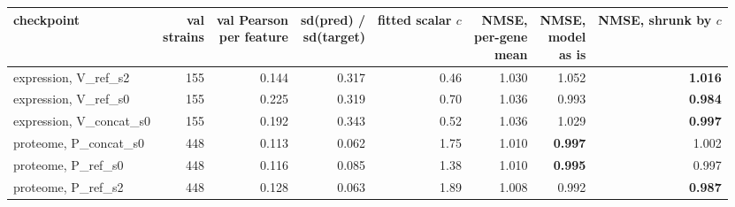 \begin{tabular}{@{}lrrrrrrr@{}}
\toprule
checkpoint & \shortstack[r]{val\\strains} & \shortstack[r]{val Pearson\\per feature} & \shortstack[r]{sd(pred) /\\sd(target)} & \shortstack[r]{fitted\\scalar $c$} & \shortstack[r]{NMSE,\\per-gene\\mean} & \shortstack[r]{NMSE,\\model\\as is} & \shortstack[r]{NMSE,\\shrunk\\by $c$} \\
\midrule
expression, V\_ref\_s2 & 155 & 0.144 & 0.317 & 0.46 & 1.030 & 1.052 & \textbf{1.016} \\
expression, V\_ref\_s0 & 155 & 0.225 & 0.319 & 0.70 & 1.036 & 0.993 & \textbf{0.984} \\
expression, V\_concat\_s0 & 155 & 0.192 & 0.343 & 0.52 & 1.036 & 1.029 & \textbf{0.997} \\
proteome, P\_concat\_s0 & 448 & 0.113 & 0.062 & 1.75 & 1.010 & \textbf{0.997} & 1.002 \\
proteome, P\_ref\_s0 & 448 & 0.116 & 0.085 & 1.38 & 1.010 & \textbf{0.995} & 0.997 \\
proteome, P\_ref\_s2 & 448 & 0.128 & 0.063 & 1.89 & 1.008 & 0.992 & \textbf{0.987} \\
\bottomrule
\end{tabular}

